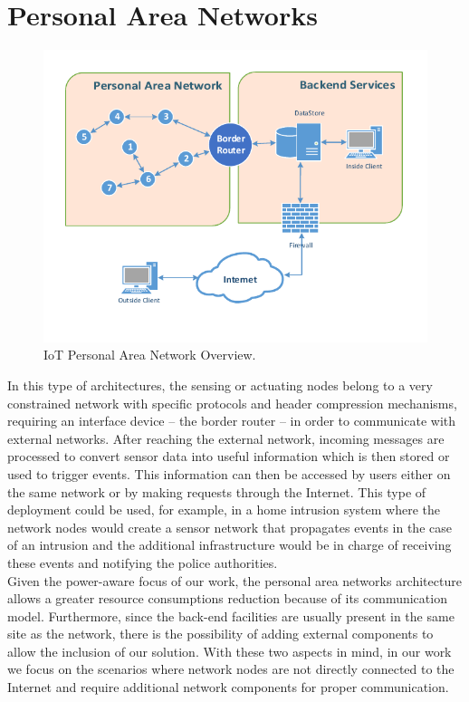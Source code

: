 \section{Personal Area Networks}

\begin{figure}[h]
  \centering
  \includegraphics[width=0.8\linewidth]{figures/Network_Overview.pdf}
  \caption{IoT Personal Area Network Overview.}
  \label{fig:net_overview_small}
\end{figure}

In this type of architectures, the sensing or actuating nodes belong to a very constrained network with specific protocols and header compression mechanisms, requiring an interface device -- the border router -- in order to communicate with external networks.
After reaching the external network, incoming messages are processed to convert sensor data into useful information which is then stored or used to trigger events. 
This information can then be accessed by users either on the same network or by making requests through the Internet. 
This type of deployment could be used, for example, in a home intrusion system where the network nodes would create a sensor network that propagates events in the case of an intrusion and the additional infrastructure would be in charge of receiving these events and notifying the police authorities.\\
 
Given the power-aware focus of our work, the personal area networks architecture allows a greater resource consumptions reduction because of its communication model. Furthermore, since the back-end facilities are usually present in the same site as the network, there is the possibility of adding external components to allow the inclusion of our solution. With these two aspects in mind, in our work we focus on the scenarios where network nodes are not directly connected to the Internet and require additional network components for proper communication.